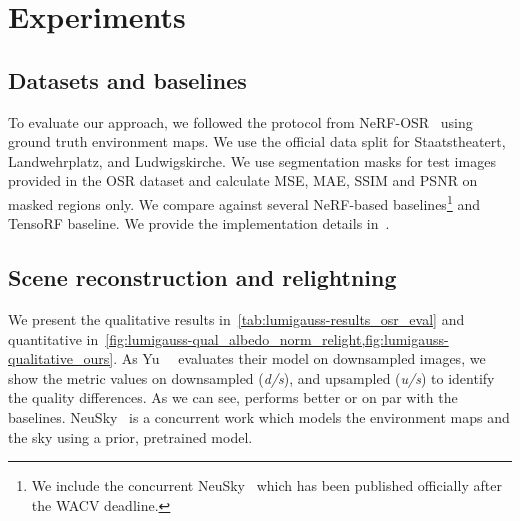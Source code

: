


\section{Experiments}
  \label{sec:lumigauss-experiments}


  \subsection{Datasets and baselines}
    To evaluate our approach, we followed the protocol from
    NeRF-OSR~\cite{rudnev2022nerfosr} using ground truth environment maps.
    We use the official data split for Staatstheatert, Landwehrplatz, and
    Ludwigskirche.
    We use segmentation masks for test images provided in the OSR dataset and
    calculate MSE, MAE, SSIM and PSNR on masked regions only.
    We compare \lumigauss against several NeRF-based baselines\footnote{We
    include the concurrent NeuSky~\cite{gardner2023neusky} which has been
    published officially after the WACV deadline.
    } and TensoRF baseline.
    We provide the implementation details in~\supplementary{}.

  \subsection{Scene reconstruction and relightning}

    We present the qualitative results
    in~\cref{tab:lumigauss-results_osr_eval} and quantitative
    in~\cref{fig:lumigauss-qual_albedo_norm_relight,fig:lumigauss-qualitative_ours}.
    As Yu~\etal~\cite{yu2020self} evaluates their model on downsampled images,
    we show the metric values on downsampled (\textit{d/s}), and upsampled
    (\textit{u/s}) to identify the quality differences.
    As we can see, \lumigauss performs better or on par with the baselines.
    NeuSky~\cite{gardner2023neusky} is a concurrent work which models the
    environment maps and the sky using a prior, pretrained model.

